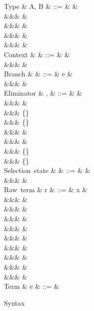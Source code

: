 \begin{figure}
\begin{syntaxfig}
\mbox{Type}
&
A, B
&
::=
&
\tyBool
&
\\
&&&
\tyInt
&
\\
&&&
&
\\
&&&
\tyList{\tyInt}
&
\\
&&&
&
\\[2mm]
\mbox{Context}
&
\Gamma
&
::=
&
\cxtEmpty
&
\\
&&&
&
\\[2mm]
\mbox{Branch}
&
\kappa
&
::=
&
e
&
\\
&&&
\sigma
&
\\[2mm]
\mbox{Eliminator}
&
\sigma, \tau
&
::=
&
&
\\
&&&
&
\\
&&&
\{\exTrue \mapsto \kappa\}
\\
&&&
\{\exFalse \mapsto \kappa\}
\\
&&&
\elimProd{\sigma}
&
\\
&&&
\elimList{\branchNil{\kappa}}{\branchCons{\sigma}}
&
\\
&&&
\{\branchNil{\kappa}\}
\\
&&&
\{\branchCons{\sigma}\}
\\[2mm]
\mbox{Selection state}
&
\alpha
&
::=
&
\top
&
\\
&&&
\bot
&
\\[2mm]
\mbox{Raw term}
&
r
&
::=
&
x
&
\\
&&&
\exTrue \mid \exFalse
&
\\
&&&
&
\\
&&&
&
\\
&&&
&
\\
&&&
&
\\
&&&
&
\\
&&&
\exNil
&
\\
&&&
&
\\
&&&
&
\\[2mm]
\mbox{Term}
&
e
&
::=
&
\end{syntaxfig}
\caption{Syntax}
\end{figure}
